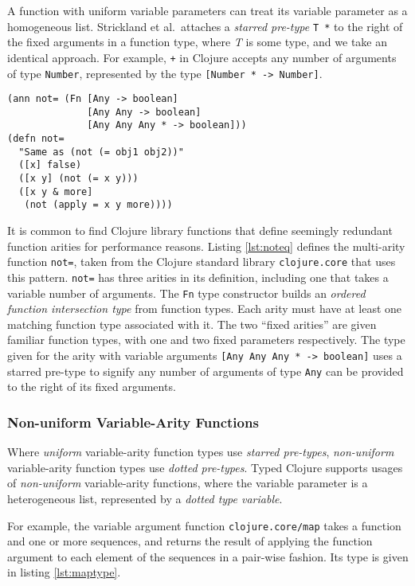 A function with uniform variable parameters can treat its variable parameter
as a homogeneous list. 
Strickland et al.\ attaches a \emph{starred pre-type} \lstinline|T *| to the right of the fixed arguments
in a function type, where \emph{T} is some type, and we take an identical approach.
For example, \lstinline|+| in Clojure accepts any number of arguments
of type \lstinline|Number|, represented by the type \lstinline|[Number * -> Number]|.


\begin{lstlisting}[caption=Typing multi-arity functions, label=lst:noteq]
(ann not= (Fn [Any -> boolean]
              [Any Any -> boolean]
              [Any Any Any * -> boolean]))
(defn not=
  "Same as (not (= obj1 obj2))"
  ([x] false)
  ([x y] (not (= x y)))
  ([x y & more]
   (not (apply = x y more))))
\end{lstlisting}

It is common to find Clojure library functions that define seemingly redundant
function arities for performance reasons.
Listing \ref{lst:noteq} defines the multi-arity function \lstinline|not=|,
taken from the Clojure standard library \lstinline|clojure.core| that uses this pattern.
\lstinline|not=| has three arities in its definition, including
one that takes a variable number of arguments.
The \lstinline|Fn| type constructor builds an \emph{ordered function intersection type} from
function types. Each arity must have at least one matching function type associated with it.
The two ``fixed arities'' are given familiar function types, with one and two fixed parameters respectively.
The type given for the arity with variable arguments \lstinline|[Any Any Any * -> boolean]|
uses a starred pre-type to signify any number of arguments of type \lstinline|Any|
can be provided to the right of its fixed arguments.

\subsubsection{Non-uniform Variable-Arity Functions}

Where \emph{uniform} variable-arity function types use \emph{starred pre-types}, \emph{non-uniform}
variable-arity function types use \emph{dotted pre-types}.
Typed Clojure supports usages of \emph{non-uniform} variable-arity functions,
where the variable parameter is a heterogeneous list, represented by a \emph{dotted type variable}.

For example, the variable argument function \lstinline|clojure.core/map| takes a function and one or more sequences,
and returns the result of applying the function argument to each element of the sequences in a pair-wise fashion.
Its type is given in listing \ref{lst:maptype}.

